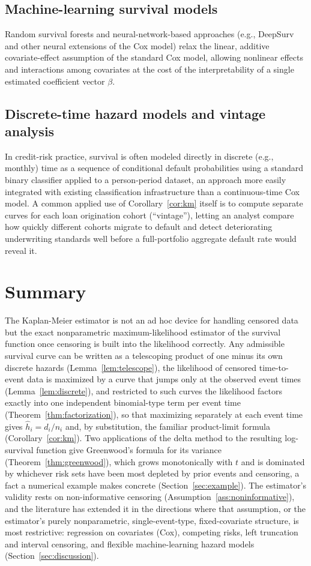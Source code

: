 \documentclass[11pt]{article}
\theoremstyle{remark}
\theoremstyle{definition}
\begin{document}
\subsection{Machine-learning survival models}
Random survival forests and neural-network-based approaches (e.g., DeepSurv and other neural extensions of the Cox model) relax the linear, additive covariate-effect assumption of the standard Cox model, allowing nonlinear effects and interactions among covariates at the cost of the interpretability of a single estimated coefficient vector $\beta$.

\subsection{Discrete-time hazard models and vintage analysis}
In credit-risk practice, survival is often modeled directly in discrete (e.g., monthly) time as a sequence of conditional default probabilities using a standard binary classifier applied to a person-period dataset, an approach more easily integrated with existing classification infrastructure than a continuous-time Cox model. A common applied use of Corollary~\ref{cor:km} itself is to compute separate curves for each loan origination cohort (``vintage''), letting an analyst compare how quickly different cohorts migrate to default and detect deteriorating underwriting standards well before a full-portfolio aggregate default rate would reveal it.

\section{Summary}
\label{sec:summary}

The Kaplan-Meier estimator is not an ad hoc device for handling censored data but the exact nonparametric maximum-likelihood estimator of the survival function once censoring is built into the likelihood correctly. Any admissible survival curve can be written as a telescoping product of one minus its own discrete hazards (Lemma~\ref{lem:telescope}), the likelihood of censored time-to-event data is maximized by a curve that jumps only at the observed event times (Lemma~\ref{lem:discrete}), and restricted to such curves the likelihood factors exactly into one independent binomial-type term per event time (Theorem~\ref{thm:factorization}), so that maximizing separately at each event time gives $\hat h_i=d_i/n_i$ and, by substitution, the familiar product-limit formula (Corollary~\ref{cor:km}). Two applications of the delta method to the resulting log-survival function give Greenwood's formula for its variance (Theorem~\ref{thm:greenwood}), which grows monotonically with $t$ and is dominated by whichever risk sets have been most depleted by prior events and censoring, a fact a numerical example makes concrete (Section~\ref{sec:example}). The estimator's validity rests on non-informative censoring (Assumption~\ref{ass:noninformative}), and the literature has extended it in the directions where that assumption, or the estimator's purely nonparametric, single-event-type, fixed-covariate structure, is most restrictive: regression on covariates (Cox), competing risks, left truncation and interval censoring, and flexible machine-learning hazard models (Section~\ref{sec:discussion}).
\end{document}
